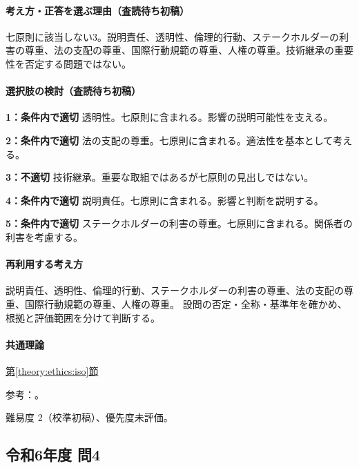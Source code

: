 \paragraph{考え方・正答を選ぶ理由（査読待ち初稿）} 七原則に該当しない3。説明責任、透明性、倫理的行動、ステークホルダーの利害の尊重、法の支配の尊重、国際行動規範の尊重、人権の尊重。技術継承の重要性を否定する問題ではない。

\paragraph{選択肢の検討（査読待ち初稿）}\mbox{}\par

\noindent\textbf{1：条件内で適切} 透明性。七原則に含まれる。影響の説明可能性を支える。\par

\noindent\textbf{2：条件内で適切} 法の支配の尊重。七原則に含まれる。適法性を基本として考える。\par

\noindent\textbf{3：不適切} 技術継承。重要な取組ではあるが七原則の見出しではない。\par

\noindent\textbf{4：条件内で適切} 説明責任。七原則に含まれる。影響と判断を説明する。\par

\noindent\textbf{5：条件内で適切} ステークホルダーの利害の尊重。七原則に含まれる。関係者の利害を考慮する。\par

\paragraph{再利用する考え方} 説明責任、透明性、倫理的行動、ステークホルダーの利害の尊重、法の支配の尊重、国際行動規範の尊重、人権の尊重。 設問の否定・全称・基準年を確かめ、根拠と評価範囲を分けて判断する。

\paragraph{共通理論} \hyperref[theory:ethics:iso]{第\ref*{theory:ethics:iso}節}

\par 参考：\cite{eth54_iso_brochure}。

\par 難易度 2（校準初稿）、優先度未評価。

\subsection{令和6年度 問4}
\label{q:r06-reg-apt-04}

